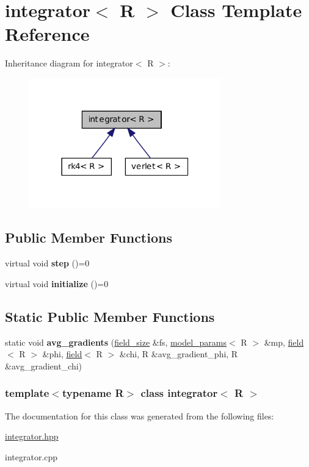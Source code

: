 \hypertarget{classintegrator}{
\section{integrator$<$ R $>$ Class Template Reference}
\label{classintegrator}
}


Inheritance diagram for integrator$<$ R $>$:
\nopagebreak
\begin{figure}[H]
\begin{center}
\leavevmode
\includegraphics[width=234pt]{classintegrator__inherit__graph}
\end{center}
\end{figure}
\subsection*{Public Member Functions}
\begin{DoxyCompactItemize}
\item 
\hypertarget{classintegrator_a68b2658800a1cf018d4f6149b7cea680}{
virtual void {\bfseries step} ()=0}
\label{classintegrator_a68b2658800a1cf018d4f6149b7cea680}

\item 
\hypertarget{classintegrator_a7302a82ffd83da07291636ad2b4ed706}{
virtual void {\bfseries initialize} ()=0}
\label{classintegrator_a7302a82ffd83da07291636ad2b4ed706}

\end{DoxyCompactItemize}
\subsection*{Static Public Member Functions}
\begin{DoxyCompactItemize}
\item 
\hypertarget{classintegrator_a4443fc784fb6a07ef2f3d521e53fa53f}{
static void {\bfseries avg\_\-gradients} (\hyperlink{structfield__size}{field\_\-size} \&fs, \hyperlink{structmodel__params}{model\_\-params}$<$ R $>$ \&mp, \hyperlink{classfield}{field}$<$ R $>$ \&phi, \hyperlink{classfield}{field}$<$ R $>$ \&chi, R \&avg\_\-gradient\_\-phi, R \&avg\_\-gradient\_\-chi)}
\label{classintegrator_a4443fc784fb6a07ef2f3d521e53fa53f}

\end{DoxyCompactItemize}
\subsubsection*{template$<$typename R$>$ class integrator$<$ R $>$}



The documentation for this class was generated from the following files:\begin{DoxyCompactItemize}
\item 
\hyperlink{integrator_8hpp}{integrator.hpp}\item 
integrator.cpp\end{DoxyCompactItemize}
